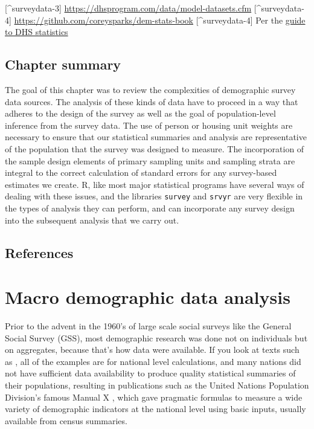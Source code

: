 \documentclass[
]{article}
\begin{document}
{[}\^{}surveydata-3{]} \url{https://dhsprogram.com/data/model-datasets.cfm}
{[}\^{}surveydata-4{]} \url{https://github.com/coreysparks/dem-stats-book}
{[}\^{}surveydata-4{]} Per the \href{https://dhsprogram.com/data/Guide-to-DHS-Statistics/index.cfm}{guide to DHS statistics}

\hypertarget{chapter-summary-1}{%
\subsection{Chapter summary}\label{chapter-summary-1}}

The goal of this chapter was to review the complexities of demographic survey data sources. The analysis of these kinds of data have to proceed in a way that adheres to the design of the survey as well as the goal of population-level inference from the survey data. The use of person or housing unit weights are necessary to ensure that our statistical summaries and analysis are representative of the population that the survey was designed to measure. The incorporation of the sample design elements of primary sampling units and sampling strata are integral to the correct calculation of standard errors for any survey-based estimates we create. R, like most major statistical programs have several ways of dealing with these issues, and the libraries \texttt{survey} and \texttt{srvyr} are very flexible in the types of analysis they can perform, and can incorporate any survey design into the subsequent analysis that we carry out.

\hypertarget{references-1}{%
\subsection{References}\label{references-1}}

\newpage

\hypertarget{macro-demographic-data-analysis}{%
\section{Macro demographic data analysis}\label{macro-demographic-data-analysis}}

Prior to the advent in the 1960's of large scale social surveys like the General Social Survey (GSS), most demographic research was done not on individuals but on aggregates, because that's how data were available. If you look at texts such as \citet{keyfitz_introduction_1968}, all of the examples are for national level calculations, and many nations did not have sufficient data availability to produce quality statistical summaries of their populations, resulting in publications such as the United Nations Population Division's famous Manual X \citeyearpar{united_nations_population_division_manual_1983}, which gave pragmatic formulas to measure a wide variety of demographic indicators at the national level using basic inputs, usually available from census summaries.
\end{document}
